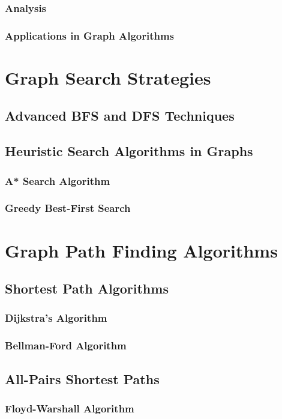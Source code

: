 \documentclass[12pt]{book} %
\begin{document}
\subsubsection{Analysis}
\subsubsection{Applications in Graph Algorithms}

\section{Graph Search Strategies}
\subsection{Advanced BFS and DFS Techniques}
\subsection{Heuristic Search Algorithms in Graphs}
\subsubsection{A* Search Algorithm}
\subsubsection{Greedy Best-First Search}

\section{Graph Path Finding Algorithms}
\subsection{Shortest Path Algorithms}
\subsubsection{Dijkstra's Algorithm}
\subsubsection{Bellman-Ford Algorithm}
\subsection{All-Pairs Shortest Paths}
\subsubsection{Floyd-Warshall Algorithm}
\end{document}
